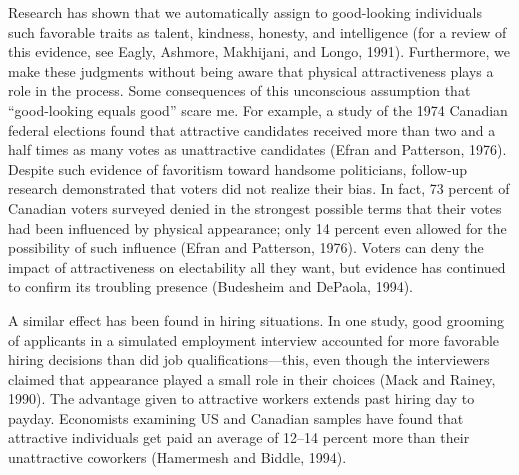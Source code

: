 {
 Research has shown that we automatically assign to good-looking
individuals such favorable traits as talent, kindness, honesty, and
intelligence (for a review of this evidence, see Eagly, Ashmore,
Makhijani, and Longo, 1991). Furthermore, we make
these judgments without being aware that physical attractiveness plays
a role in the process. Some consequences of this unconscious assumption
that ``good-looking equals good''
scare me. For example, a study of the 1974 Canadian federal elections
found that attractive candidates received more than two and a half
times as many votes as unattractive candidates (Efran and Patterson,
1976). Despite such evidence of favoritism toward
handsome politicians, follow-up research demonstrated that voters did
not realize their bias. In fact, 73 percent of Canadian voters surveyed
denied in the strongest possible terms that their votes had been
influenced by physical appearance; only 14 percent even allowed for the
possibility of such influence (Efran and Patterson,
1976). Voters can deny the impact of attractiveness
on electability all they want, but evidence has continued to confirm
its troubling presence (Budesheim and DePaola,
1994).}

{
 A similar effect has been found in hiring situations. In one
study, good grooming of applicants in a simulated employment interview
accounted for more favorable hiring decisions than did job
qualifications---this, even though the interviewers claimed that
appearance played a small role in their choices (Mack and Rainey,
1990). The advantage given to attractive workers
extends past hiring day to payday. Economists examining US and Canadian
samples have found that attractive individuals get paid an average of
12--14 percent more than their unattractive coworkers (Hamermesh and
Biddle, 1994).}


